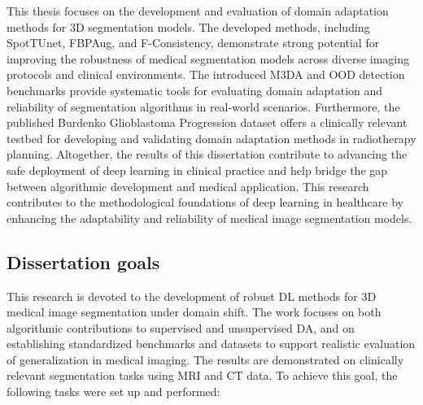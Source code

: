 This thesis focuses on the development and evaluation of domain adaptation methods for 3D segmentation models. The developed methods, including SpotTUnet, FBPAug, and F-Consistency, demonstrate strong potential for improving the robustness of medical segmentation models across diverse imaging protocols and clinical environments. The introduced M3DA and OOD detection benchmarks provide systematic tools for evaluating domain adaptation and reliability of segmentation algorithms in real-world scenarios. Furthermore, the published Burdenko Glioblastoma Progression dataset offers a clinically relevant testbed for developing and validating domain adaptation methods in radiotherapy planning. Altogether, the results of this dissertation contribute to advancing the safe deployment of deep learning in clinical practice and help bridge the gap between algorithmic development and medical application. This research contributes to the methodological foundations of deep learning in healthcare by enhancing the adaptability and reliability of medical image segmentation models.


\subsection*{Dissertation goals}

This research is devoted to the development of robust DL methods for 3D medical image segmentation under domain shift. The work focuses on both algorithmic contributions to supervised and unsupervised DA, and on establishing standardized benchmarks and datasets to support realistic evaluation of generalization in medical imaging. The results are demonstrated on clinically relevant segmentation tasks using MRI and CT data.
To achieve this goal, the following tasks were set up and performed:

